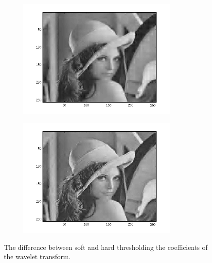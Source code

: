 \documentclass[a4paper,11pt]{article}
\begin{document}
\begin{figure}[ht!]
  \centering
  \begin{subfigure}{.50\textwidth}
    \centering
    \includegraphics[width=80mm]{thresholding_soft.png}
  \end{subfigure}%
  \begin{subfigure}{.50\textwidth}
    \centering
    \includegraphics[width=80mm]{thresholding_hard.png}
  \end{subfigure}%
  \caption{The difference between soft and hard thresholding the coefficients of the wavelet transform.}
  \label{comparison}
\end{figure}
\end{document}

